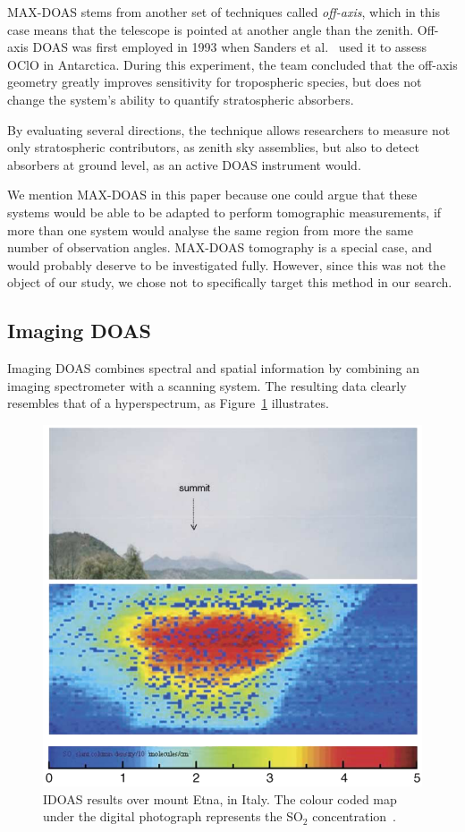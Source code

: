 MAX-DOAS stems from another set of techniques called \emph{off-axis},
which in this case means that the telescope is pointed at another angle
than the zenith. Off-axis DOAS was first employed in 1993 when Sanders
et al.~\cite{Sanders1993} used it to assess OClO in Antarctica. During this
experiment, the team concluded that the off-axis geometry greatly
improves sensitivity for tropospheric species, but does not change the
system's ability to quantify stratospheric absorbers.

By evaluating several directions, the technique allows researchers to
measure not only stratospheric contributors, as zenith sky assemblies,
but also to detect absorbers at ground level, as an active DOAS
instrument would.

We mention MAX-DOAS in this paper because one could argue that these
systems would be able to be adapted to perform tomographic measurements,
if more than one system would analyse the same region from more the same
number of observation angles. MAX-DOAS tomography is a special case, and
would probably deserve to be investigated fully. However, since this was
not the object of our study, we chose not to specifically target this
method in our search.

\subsection{Imaging DOAS}%
\label{sub:imaging_doas}

Imaging DOAS combines spectral and spatial information by combining an
imaging spectrometer with a scanning system. The resulting data clearly
resembles that of a hyperspectrum, as Figure~\ref{fig:idoas_results}
illustrates.

\begin{figure}[htpb]
    \centering
    \includegraphics[width=0.5\linewidth]{img/idoas_results.png}
    \caption{IDOAS results over mount Etna, in Italy. The colour coded
    map under the digital photograph represents the SO$_2$
concentration~\cite{Bobrowski2006}.}
\label{fig:idoas_results}
\end{figure}

